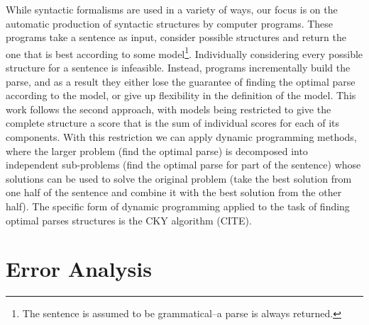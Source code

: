 
While syntactic formalisms are used in a variety of ways, our focus is on the automatic production of syntactic structures by computer programs.
These programs take a sentence as input, consider possible structures and return the one that is best according to some model\footnote{The sentence is assumed to be grammatical--a parse is always returned.}.
Individually considering every possible structure for a sentence is infeasible.
Instead, programs incrementally build the parse, and as a result they either lose the guarantee of finding the optimal parse according to the model, or give up flexibility in the definition of the model.
This work follows the second approach, with models being restricted to give the complete structure a score that is the sum of individual scores for each of its components.
With this restriction we can apply dynamic programming methods, where the larger problem (find the optimal parse) is decomposed into independent sub-problems (find the optimal parse for part of the sentence) whose solutions can be used to solve the original problem (take the best solution from one half of the sentence and combine it with the best solution from the other half).
The specific form of dynamic programming applied to the task of finding optimal parses structures is the CKY algorithm (CITE).

\section{Error Analysis}

